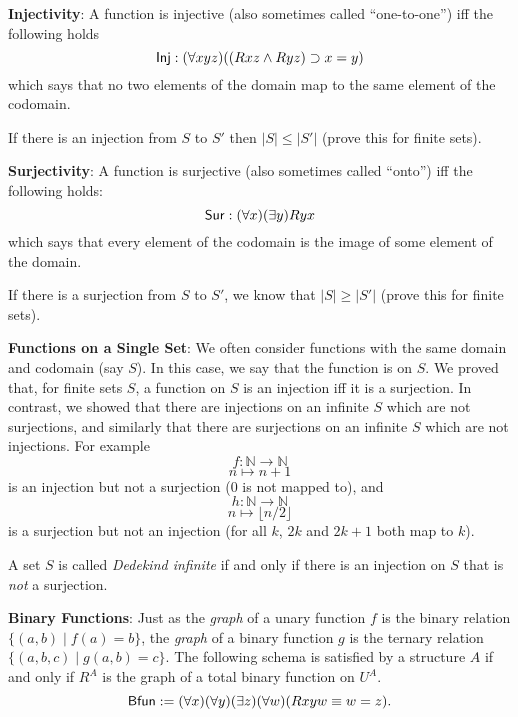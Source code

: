 \begin{mdframed}[linewidth=1]
\textbf{Injectivity}: A function is injective (also sometimes called ``one-to-one'') iff the following holds
\[
    \mbox{$\mathsf{Inj}$}: (\forall xyz)((Rxz \land Ryz) \supset x = y) 
\]
which says that no two elements of the domain map to the same element of the codomain. %

If there is an injection from $S$ to $S'$ then $|S| \leq |S'|$ (prove this for finite sets). 

\textbf{Surjectivity}: A function is surjective (also sometimes called ``onto'') iff the following holds:
\[
    \mbox{$\mathsf{Sur}$}: (\forall x)(\exists y)Ryx
\]
which says that every element of the codomain is the image of some element of the domain. %

If there is a surjection from $S$ to $S'$, we know that $|S| \geq |S'|$ (prove this for finite sets). 

\textbf{Functions on a Single Set}:
We often consider functions with the same domain and codomain (say $S$). In this case, we say that the function is on $S$. 
We proved that, for finite sets $S$, a function on $S$ is an injection iff it is a surjection. 
In contrast, we showed that there are injections on an infinite $S$ which are not surjections, and similarly that there are surjections on an infinite $S$ which are not injections. For example
\[
    f: \mathbb{N} \rightarrow \mathbb{N}
\]
\[
    n \mapsto n + 1
\]
is an injection but not a surjection (0 is not mapped to), and 
\[
    h: \mathbb{N} \rightarrow \mathbb{N}
\]
\[
    n \mapsto \lfloor n/2\rfloor
\]
is a surjection but not an injection (for all $k$, $2k$ and $2k + 1$ both map to $k$).

A set $S$ is called \emph{Dedekind infinite} if and only if
there is an injection on $S$ that is \emph{not} a surjection.

\textbf{Binary Functions}: Just as the \emph{graph} of a unary function $f$ is the binary relation $\{(a,b)\mid f(a)=b\}$, the \emph{graph} of a binary function $g$ is the ternary relation $\{(a,b,c)\mid g(a,b)=c\}$. The following schema is satisfied by a structure $A$ if and only if $R^A$ is the graph of a total binary function on $U^A$.
\[
    \mbox{$\mathsf{Bfun}$}:= (\forall x)(\forall y)(\exists z)(\forall w)(Rxyw \equiv w = z).
\]


\end{mdframed}
